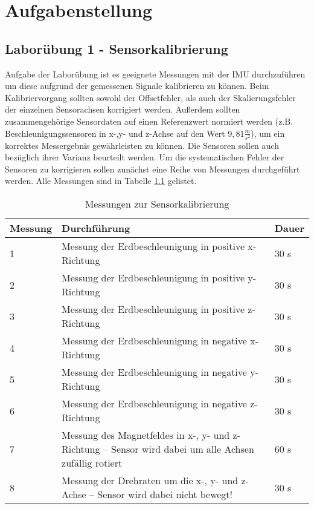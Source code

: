 \chapter{Aufgabenstellung}
\label{sec: Aufgabenstellung}

\section{Laborübung 1 - Sensorkalibrierung}

Aufgabe der Laborübung ist es geeignete Messungen mit der IMU durchzuführen um diese aufgrund der gemessenen Signale kalibrieren zu können. Beim Kalibriervorgang sollten sowohl der Offsetfehler, als auch der Skalierungsfehler der einzelnen Sensorachsen korrigiert werden. Außerdem sollten zusammengehörige Sensordaten auf einen Referenzwert normiert werden (z.B. Beschleunigungssensoren in x-,y- und z-Achse auf den Wert $9,81\frac{m}{s^2}$), um ein korrektes Messergebnis gewährleisten zu können. Die Sensoren sollen auch bezüglich ihrer Varianz beurteilt werden.
Um die systematischen Fehler der Sensoren zu korrigieren sollen zunächst eine Reihe von Messungen durchgeführt werden. Alle Messungen sind in Tabelle \ref{tab:Messungen} gelistet.

\begin{table}[h]
	\centering
	\begin{tabular}{|p{2cm}|p{10.6cm}|p{2cm}|}
		\hline
		\rowcolor{lightgray}\textbf{Messung} & \textbf{Durchführung} & \textbf{Dauer} \\
		\hline
		1	&Messung der Erdbeschleunigung in positive x-Richtung			& 30 s\\
		\hline
		2	&Messung der Erdbeschleunigung in positive y-Richtung			& 30 s\\
		\hline
		3	&Messung der Erdbeschleunigung in positive z-Richtung			& 30 s\\
		\hline
		4	&Messung der Erdbeschleunigung in negative x-Richtung			& 30 s\\
		\hline
		5	&Messung der Erdbeschleunigung in negative y-Richtung			& 30 s\\
		\hline
		6	&Messung der Erdbeschleunigung in negative z-Richtung			& 30 s\\
		\hline
		7	&Messung des Magnetfeldes in x-, y- und z-Richtung – Sensor wird dabei um alle Achsen zufällig rotiert	& 60 s\\
		\hline
		8	&Messung der Drehraten um die x-, y- und z-Achse – Sensor wird dabei nicht bewegt!	& 30 s\\
		\hline
	\end{tabular}
	\caption{Messungen zur Sensorkalibrierung}
	\label{tab:Messungen}
\end{table}

